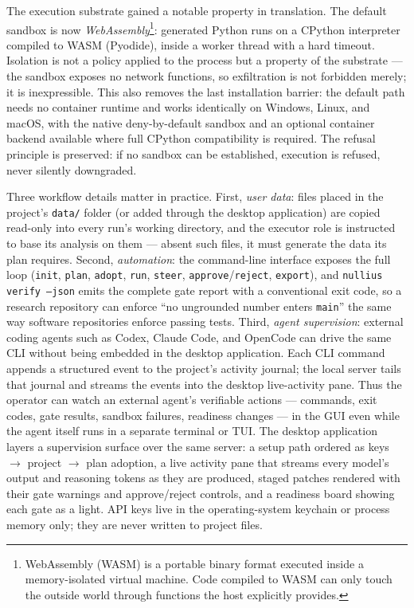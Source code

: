 \documentclass[11pt]{article}
\begin{document}
The execution substrate gained a notable property in translation. The default sandbox is now \emph{WebAssembly}\footnote{WebAssembly (WASM) is a portable binary format executed inside a memory-isolated virtual machine. Code compiled to WASM can only touch the outside world through functions the host explicitly provides.}: generated Python runs on a CPython interpreter compiled to WASM (Pyodide), inside a worker thread with a hard timeout. Isolation is not a policy applied to the process but a property of the substrate --- the sandbox exposes no network functions, so exfiltration is not forbidden merely; it is inexpressible. This also removes the last installation barrier: the default path needs no container runtime and works identically on Windows, Linux, and macOS, with the native deny-by-default sandbox and an optional container backend available where full CPython compatibility is required. The refusal principle is preserved: if no sandbox can be established, execution is refused, never silently downgraded.

Three workflow details matter in practice. First, \emph{user data}: files placed in the project's \texttt{data/} folder (or added through the desktop application) are copied read-only into every run's working directory, and the executor role is instructed to base its analysis on them --- absent such files, it must generate the data its plan requires. Second, \emph{automation}: the command-line interface exposes the full loop (\texttt{init}, \texttt{plan}, \texttt{adopt}, \texttt{run}, \texttt{steer}, \texttt{approve}/\texttt{reject}, \texttt{export}), and \texttt{nullius verify --json} emits the complete gate report with a conventional exit code, so a research repository can enforce ``no ungrounded number enters \texttt{main}'' the same way software repositories enforce passing tests. Third, \emph{agent supervision}: external coding agents such as Codex, Claude Code, and OpenCode can drive the same CLI without being embedded in the desktop application. Each CLI command appends a structured event to the project's activity journal; the local server tails that journal and streams the events into the desktop live-activity pane. Thus the operator can watch an external agent's verifiable actions --- commands, exit codes, gate results, sandbox failures, readiness changes --- in the GUI even while the agent itself runs in a separate terminal or TUI. The desktop application layers a supervision surface over the same server: a setup path ordered as keys $\rightarrow$ project $\rightarrow$ plan adoption, a live activity pane that streams every model's output and reasoning tokens as they are produced, staged patches rendered with their gate warnings and approve/reject controls, and a readiness board showing each gate as a light. API keys live in the operating-system keychain or process memory only; they are never written to project files.
\end{document}
